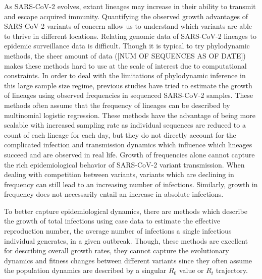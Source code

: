\documentclass[12pt]{article}
\begin{document}
As SARS-CoV-2 evolves, extant lineages may increase in their ability to transmit and escape acquired immunity. %
Quantifying the observed growth advantages of SARS-CoV-2 variants of concern allow us to understand which variants are able to thrive in different locations.
Relating genomic data of SARS-CoV-2 lineages to epidemic surveillance data is difficult. 
Though it is typical to try phylodynamic methods, the sheer amount of data ([NUM OF SEQUENCES AS OF DATE]) makes these methods hard to use at the scale of interest due to computational constraints.
In order to deal with the limitations of phylodynamic inference in this large sample size regime, previous studies have tried to estimate the growth of lineages using observed frequencies in sequenced SARS-CoV-2 samples. %
These methods often assume that the frequency of lineages can be described by multinomial logistic regression. \cite{Ito2021} 
These methods have the advantage of being more scalable with increased sampling rate as individual sequences are reduced to a count of each lineage for each day, but they do not directly account for the complicated infection and transmission dynamics which influence which lineages succeed and are observed in real life.
Growth of frequencies alone cannot capture the rich epidemiological behavior of SARS-CoV-2 variant transmission.
When dealing with competition between variants, variants which are declining in frequency can still lead to an increasing number of infections. 
Similarly, growth in frequency does not necessarily entail an increase in absolute infections.

To better capture epidemiological dynamics, there are methods which describe the growth of total infections using case data to estimate the effective reproduction number, the average number of infections a single infectious individual generates, in a given outbreak.
Though, these methods are excellent for describing overall growth rates, they cannot capture the evolutionary dynamics and fitness changes between different variants since they often assume the population dynamics are described by a singular $R_{0}$ value or $R_{t}$ trajectory. \cites{Cori2013, Abbott2020} %
\end{document}
